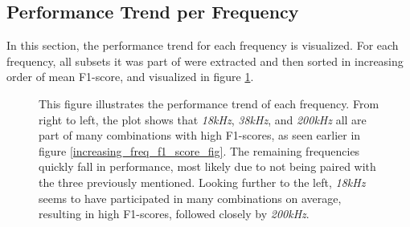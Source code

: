         
    \subsection{Performance Trend per Frequency}
        In this section, the performance trend for each frequency is visualized. For each frequency, all subsets it was part of were extracted and then sorted in increasing order of mean F1-score, and visualized in figure \ref{performance_trend_fig}. 
        
        \begin{figure}[H]
            \centering
            
            \caption[Performance trend per frequency]{This figure illustrates the performance trend of each frequency. From right to left, the plot shows that \textit{18kHz}, \textit{38kHz}, and \textit{200kHz} all are part of many combinations with high F1-scores, as seen earlier in figure \ref{increasing_freq_f1_score_fig}. The remaining frequencies quickly fall in performance, most likely due to not being paired with the three previously mentioned. Looking further to the left, \textit{18kHz} seems to have participated in many combinations on average, resulting in high F1-scores, followed closely by \textit{200kHz}.}
          	\medskip 
            \label{performance_trend_fig}
        \end{figure}
        

